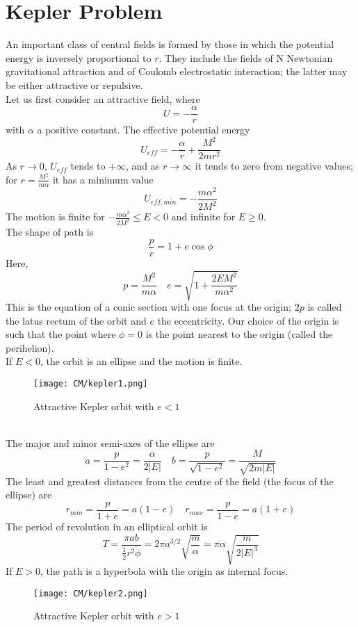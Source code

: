 \documentclass[cyan]{elegantnote}
\begin{document}
\section{Kepler Problem}
An important class of central fields is formed by those in which the potential energy is inversely proportional to $r$. They include the fields of N Newtonian gravitational attraction and of Coulomb electrostatic interaction; the latter may be either attractive or repulsive.\\
Let us first consider an attractive field, where
\[U = -\frac{\alpha}{r}\]
with $\alpha$ a positive constant. The effective potential energy
\[U_{eff} = -\frac{\alpha}{r} + \frac{M^2}{2mr^2}\]
As $r \to 0$, $U_{eff}$ tends to $+\infty$, and as $r \to \infty$ it tends to zero from negative values; for $r = \frac{M^2}{m\alpha}$ it has a minimum value
\[U_{eff,min} = -\frac{m\alpha^2}{2M^2}\]
The motion is finite for $-\frac{m\alpha^2}{2M^2} \leq E < 0$ and infinite for $E \ge 0$.\\
The shape of path is
\[\frac{p}{r} = 1 + e \cos \phi\]
Here,
\[p = \frac{M^2}{m\alpha} \quad e = \sqrt{1 + \frac{2EM^2}{m \alpha^2}}\]
This is the equation of a conic section with one focus at the origin; $2p$ is called the latus rectum of the orbit and $e$ the eccentricity. Our choice of the origin is such that the point where $\phi = 0$ is the point nearest to the origin (called the perihelion). \\
If $E < 0$,  the orbit is an ellipse and the motion is finite.
\begin{figure}[!h]
	\centering
	\texttt{[image: CM/kepler1.png]}
	\caption{Attractive Kepler orbit with $e < 1$}
\end{figure}\\
The major and minor semi-axes of the ellipse are
\[a = \frac{p}{1-e^2} = \frac{\alpha}{2|E|} \quad b = \frac{p}{\sqrt{1-e^2}} = \frac{M}{\sqrt{2m|E|}}\]
The least and greatest distances from the centre of the field (the focus of the ellipse) are
\[r_{min} = \frac{p}{1+e} = a(1-e) \quad r_{max} = \frac{p}{1-e} = a(1+e)\]
The period of revolution in an elliptical orbit is
\[T = \frac{\pi a b}{\frac{1}{2}r^2 \dot{\phi}} = 2\pi a^{3/2}\sqrt{\frac{m}{\alpha}} = \pi \alpha \sqrt{\frac{m}{2|E|^3}}\]
If $E > 0$, the path is a hyperbola with the origin as internal focus. 
\begin{figure}[!h]
	\centering
	\texttt{[image: CM/kepler2.png]}
	\caption{Attractive Kepler orbit with $e > 1$}
\end{figure}\\
\end{document}
